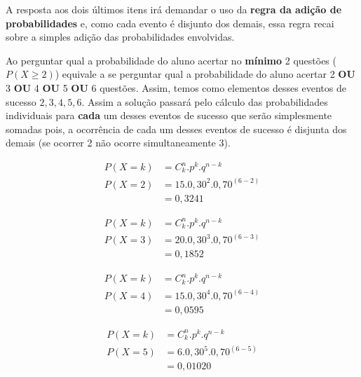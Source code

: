 \documentclass[
]{book}
\begin{document}
\hfill\break

A resposta aos dois últimos itens irá demandar o uso da \textbf{regra da adição de probabilidades} e, como cada evento é disjunto dos demais, essa regra recai sobre a simples adição das probabilidades envolvidas.

\hfill\break

Ao perguntar qual a probabilidade do aluno acertar no \textbf{mínimo} 2 questões (\(P(X \ge 2)\)) equivale a se perguntar qual a probabilidade do aluno acertar 2 \textbf{OU} 3 \textbf{OU} 4 \textbf{OU} 5 \textbf{OU} 6 questões. Assim, temos como elementos desses eventos de sucesso \({2, 3, 4, 5, 6}\). Assim a solução passará pelo cálculo das probabilidades individuais para \textbf{cada} um desses eventos de sucesso que serão simplesmente somadas pois, a ocorrência de cada um desses eventos de sucesso é disjunta dos demais (se ocorrer 2 não ocorre simultaneamente 3).

\hfill\break

\begin{align*}
P\left(X=k\right) & ={C}_{k}^{n}. {p}^{k}. {q}^{n-k} \\
P\left(X=2\right) & = 15 . 0,30^{2} . 0,70^{(6-2)} \\
                  & = 0,3241
\end{align*}

\hfill\break

\begin{align*}
P\left(X=k\right) & ={C}_{k}^{n}. {p}^{k}. {q}^{n-k} \\
P\left(X=3\right) & = 20 . 0,30^{3} . 0,70^{(6-3)} \\
                  & = 0,1852
\end{align*}

\hfill\break

\begin{align*}
P\left(X=k\right) & ={C}_{k}^{n}. {p}^{k}. {q}^{n-k} \\
P\left(X=4\right) & = 15 . 0,30^{4} . 0,70^{(6-4)} \\
                  & = 0,0595
\end{align*}

\hfill\break

\begin{align*}
P\left(X=k\right) & ={C}_{k}^{n}. {p}^{k}. {q}^{n-k} \\
P\left(X=5\right) & = 6 . 0,30^{5} . 0,70^{(6-5)} \\
                  & = 0,01020
\end{align*}
\end{document}
